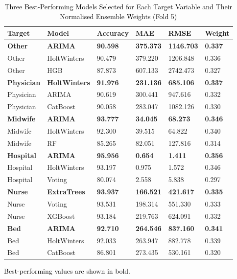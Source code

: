 \documentclass[final, 9pt, twocolumn]{saucis}
\newcommand{\rev}[1]{\textcolor{black}{#1}}
\begin{document}
\begin{table}[htbp]
\begin{threeparttable}
\centering
\caption{\rev{Three Best-Performing Models Selected for Each Target Variable and Their Normalised Ensemble Weights (Fold 5)}}
\label{tab:ensemble_selection}
\small
\begin{tabular}{p{0.8cm} p{1.2cm} p{1cm} p{1.2cm} p{1.2cm} p{0.8cm}}
\hline
\textbf{Target} & \textbf{Model} & \textbf{Accuracy} & \textbf{MAE} & \textbf{RMSE} & \textbf{Weight} \\
\hline
\textbf{Other}    & \textbf{ARIMA}                & \textbf{90.598} & \textbf{375.373} & \textbf{1146.703} & \textbf{0.337} \\
Other    & HoltWinters          & 90.479 & 379.220 & 1206.848 & 0.336 \\
Other    & HGB & 87.873 & 607.133 & 2742.473 & 0.327 \\
\hline
\textbf{Physician}   & \textbf{HoltWinters}          & \textbf{91.976} & \textbf{231.136} &  \textbf{685.106} & \textbf{0.337} \\
Physician   & ARIMA                & 90.619 & 300.441 &  947.616 & 0.332 \\
Physician   & CatBoost             & 90.058 & 283.047 & 1082.126 & 0.330 \\
\hline
\textbf{Midwife}  & \textbf{ARIMA}                & \textbf{93.777} &  \textbf{34.045} &   \textbf{68.273} & \textbf{0.346} \\
Midwife  & HoltWinters          & 92.300 &  39.515 &   64.822 & 0.340 \\
Midwife  & RF         & 85.265 &  82.051 &  127.816 & 0.314 \\
\hline
\textbf{Hospital} & \textbf{ARIMA}                & \textbf{95.956} &   \textbf{0.654} &    \textbf{1.411} & \textbf{0.356} \\
Hospital & HoltWinters          & 93.197 &   0.975 &    1.572 & 0.346 \\
Hospital & Voting               & 80.074 &   2.558 &    5.838 & 0.297 \\
\hline
\textbf{Nurse}    & \textbf{ExtraTrees}           & \textbf{93.937} & \textbf{166.521} &  \textbf{421.617} & \textbf{0.335} \\
Nurse    & Voting               & 93.531 & 198.314 &  551.330 & 0.333 \\
Nurse    & XGBoost              & 93.184 & 219.763 &  624.091 & 0.332 \\
\hline
\textbf{Bed}      & \textbf{ARIMA}                & \textbf{92.710} & \textbf{264.546} &  \textbf{837.160} & \textbf{0.341} \\
Bed      & HoltWinters          & 92.033 & 263.947 &  882.778 & 0.339 \\
Bed      & CatBoost             & 86.801 & 273.435 &  530.161 & 0.320 \\
\hline
\end{tabular}
\begin{tablenotes}
\footnotesize
\item \rev{Best-performing values are shown in bold.}
\end{tablenotes}
\end{threeparttable}
\end{table}
\end{document}
